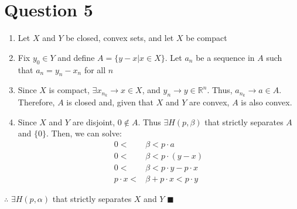 \documentclass{article}
\newcommand{\R}{\mathbb{R}}
\begin{document}
\section*{Question 5}
\begin{enumerate}
	\item Let $X$ and $Y$ be closed, convex sets, and let $X$ be compact
	\item Fix $y_0\in Y$ and define $A=\{y-x|x\in X\}$. Let $a_n$ be a sequence in $A$ such that $a_n = y_n-x_n$ for all $n$
	\item Since $X$ is compact, $\exists x_{n_k}\rightarrow x\in X$, and $y_n\rightarrow y\in\R^n$. Thus, $a_{n_k}\rightarrow a\in A$. Therefore, $A$ is closed and, given that $X$ and $Y$ are convex, $A$ is also convex. 
	\item Since $X$ and $Y$ are disjoint, $0\notin A$. Thus $\exists H(p,\beta)$ that strictly separates $A$ and $\{0\}$. Then, we can solve:
		\begin{align*}
			0<&\beta<p\cdot a	\\
			0<&\beta<p\cdot(y-x) \\
			0<&\beta<p\cdot y - p\cdot x \\
			p\cdot x < &\beta + p\cdot x < p\cdot y
		\end{align*}
\end{enumerate}
$\therefore$ $\exists H(p,\alpha)$ that strictly separates $X$ and $Y$ $\blacksquare$


\end{document}
